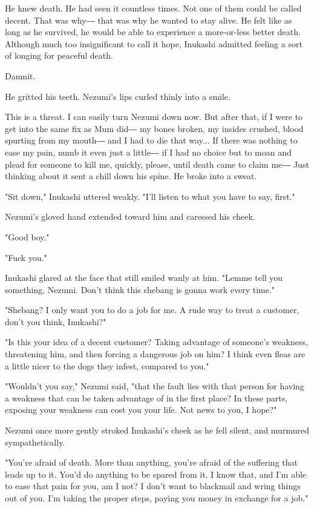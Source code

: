 He knew death. He had seen it countless times. Not one of them could be
called decent. That was why― that was why he wanted to stay alive. He
felt like as long as he survived, he would be able to experience a
more-or-less better death. Although much too insignificant to call it
hope, Inukashi admitted feeling a sort of longing for peaceful death.

Damnit.

He gritted his teeth. Nezumi's lips curled thinly into a smile.

This is a threat. I can easily turn Nezumi down now. But after that, if
I were to get into the same fix as Mum did― my bones broken, my insides
crushed, blood spurting from my mouth― and I had to die that way... If
there was nothing to ease my pain, numb it even just a little― if I had
no choice but to moan and plead for someone to kill me, quickly, please,
until death came to claim me― Just thinking about it sent a chill down
his spine. He broke into a sweat.

"Sit down," Inukashi uttered weakly. "I'll listen to what you have to
say, first."

Nezumi's gloved hand extended toward him and caressed his cheek.

"Good boy."

"Fuck you."

Inukashi glared at the face that still smiled wanly at him. "Lemme tell
you something, Nezumi. Don't think this shebang is gonna work every
time."

"Shebang? I only want you to do a job for me. A rude way to treat a
customer, don't you think, Inukashi?"

"Is this your idea of a decent customer? Taking advantage of someone's
weakness, threatening him, and then forcing a dangerous job on him? I
think even fleas are a little nicer to the dogs they infest, compared to
you."

"Wouldn't you say," Nezumi said, "that the fault lies with that person
for having a weakness that can be taken advantage of in the first place?
In these parts, exposing your weakness can cost you your life. Not news
to you, I hope?"

Nezumi once more gently stroked Inukashi's cheek as he fell silent, and
murmured sympathetically.

"You're afraid of death. More than anything, you're afraid of the
suffering that leads up to it. You'd do anything to be spared from it. I
know that, and I'm able to ease that pain for you, am I not? I don't
want to blackmail and wring things out of you. I'm taking the proper
steps, paying you money in exchange for a job."

